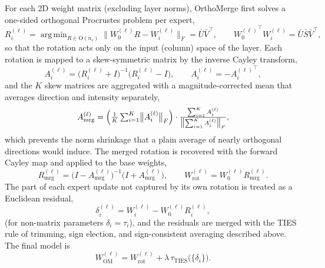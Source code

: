 \documentclass[11pt, a4paper]{utda}
\theoremstyle{plain}
\theoremstyle{definition}
\theoremstyle{remark}
\DeclareMathOperator*{\argmin}{arg\,min}
\providecommand{\TIES}{\mathrm{TIES}}
\begin{document}
For each 2D weight matrix (excluding layer norms), OrthoMerge first solves a
one-sided orthogonal Procrustes problem per expert,
\begin{equation}
    R_i^{(\ell)}
    = \argmin_{R \in \mathrm{O}(n_\ell)}
      \bigl\lVert W_0^{(\ell)} R - W_i^{(\ell)} \bigr\rVert_F
    = \bar{U}\bar{V}^\top,
    \qquad
    {W_0^{(\ell)}}^\top W_i^{(\ell)} = \bar{U}\bar{S}\bar{V}^\top,
\end{equation}
so that the rotation acts only on the input (column) space of the layer. Each
rotation is mapped to a skew-symmetric matrix by the inverse Cayley transform,
\begin{equation}
    A_i^{(\ell)} = \bigl(R_i^{(\ell)} + I\bigr)^{-1}\bigl(R_i^{(\ell)} - I\bigr),
    \qquad
    A_i^{(\ell)} = -{A_i^{(\ell)}}^\top,
\end{equation}
and the $K$ skew matrices are aggregated with a magnitude-corrected mean that
averages direction and intensity separately,
\begin{equation}
    A_{\mathrm{mrg}}^{(\ell)}
    = \Bigl(\tfrac{1}{K}\textstyle\sum_{i=1}^{K}
      \bigl\lVert A_i^{(\ell)} \bigr\rVert_F\Bigr)
      \cdot
      \frac{\sum_{i=1}^{K} A_i^{(\ell)}}
           {\bigl\lVert \sum_{i=1}^{K} A_i^{(\ell)} \bigr\rVert_F},
\end{equation}
which prevents the norm shrinkage that a plain average of nearly orthogonal
directions would induce. The merged rotation is recovered with the forward
Cayley map and applied to the base weights,
\begin{equation}
    R_{\mathrm{mrg}}^{(\ell)}
    = \bigl(I - A_{\mathrm{mrg}}^{(\ell)}\bigr)^{-1}
      \bigl(I + A_{\mathrm{mrg}}^{(\ell)}\bigr),
    \qquad
    W_{\mathrm{rot}}^{(\ell)} = W_0^{(\ell)}R_{\mathrm{mrg}}^{(\ell)}.
\end{equation}
The part of each expert update not captured by its own rotation is treated as a
Euclidean residual,
\begin{equation}
    \delta_i^{(\ell)} = W_i^{(\ell)}-W_0^{(\ell)}R_i^{(\ell)},
\end{equation}
(for non-matrix parameters $\delta_i = \tau_i$), and the residuals are merged
with the TIES rule of trimming, sign election, and sign-consistent averaging
described above. The final model is
\begin{equation}
    W_{\mathrm{OM}}^{(\ell)}
    = W_{\mathrm{rot}}^{(\ell)} + \lambda\, \tau_{\TIES}\bigl(\{\delta_i\}\bigr).
\end{equation}
\end{document}
